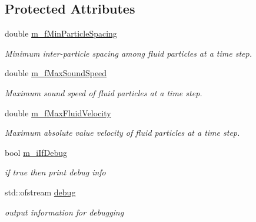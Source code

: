 \subsection*{Protected Attributes}
\begin{DoxyCompactItemize}
\item 
\hypertarget{classLPSolver_a340b02b362cffd269af3e11a5b5880db}{double \hyperlink{classLPSolver_a340b02b362cffd269af3e11a5b5880db}{m\-\_\-f\-Min\-Particle\-Spacing}}\label{classLPSolver_a340b02b362cffd269af3e11a5b5880db}

\begin{DoxyCompactList}\small\item\em Minimum inter-\/particle spacing among fluid particles at a time step. \end{DoxyCompactList}\item 
\hypertarget{classLPSolver_a788fe64d779808fd4d57c41336bf604d}{double \hyperlink{classLPSolver_a788fe64d779808fd4d57c41336bf604d}{m\-\_\-f\-Max\-Sound\-Speed}}\label{classLPSolver_a788fe64d779808fd4d57c41336bf604d}

\begin{DoxyCompactList}\small\item\em Maximum sound speed of fluid particles at a time step. \end{DoxyCompactList}\item 
\hypertarget{classLPSolver_ac1107221647c560b5133225491b682bd}{double \hyperlink{classLPSolver_ac1107221647c560b5133225491b682bd}{m\-\_\-f\-Max\-Fluid\-Velocity}}\label{classLPSolver_ac1107221647c560b5133225491b682bd}

\begin{DoxyCompactList}\small\item\em Maximum absolute value velocity of fluid particles at a time step. \end{DoxyCompactList}\item 
\hypertarget{classLPSolver_a7206c069515e95ea570c190e4ae31607}{bool \hyperlink{classLPSolver_a7206c069515e95ea570c190e4ae31607}{m\-\_\-i\-If\-Debug}}\label{classLPSolver_a7206c069515e95ea570c190e4ae31607}

\begin{DoxyCompactList}\small\item\em if true then print debug info \end{DoxyCompactList}\item 
\hypertarget{classLPSolver_a4147d2dc298f44e0382a8851b013045e}{std\-::ofstream \hyperlink{classLPSolver_a4147d2dc298f44e0382a8851b013045e}{debug}}\label{classLPSolver_a4147d2dc298f44e0382a8851b013045e}

\begin{DoxyCompactList}\small\item\em output information for debugging \end{DoxyCompactList}\end{DoxyCompactItemize}


